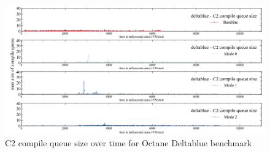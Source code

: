 \begin{figure}[ht]
  \begin{center}
    \centering
    \includegraphics[width=1.0\textwidth]{figures/octane_queue_deltablue_separate_c2.png}
    \caption{C2 compile queue size over time for Octane Deltablue benchmark}
    \label{f:octane_queue_deltablue_separate_c2}
  \end{center}
\end{figure}
\clearpage

